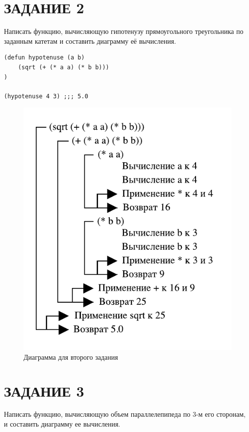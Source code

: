 \section{ЗАДАНИЕ 2}

Написать функцию, вычисляющую гипотенузу прямоугольного
треугольника по заданным катетам и составить диаграмму её вычисления.

\begin{lstlisting}
(defun hypotenuse (a b)
    (sqrt (+ (* a a) (* b b)))
)

(hypotenuse 4 3) ;;; 5.0
\end{lstlisting}

\begin{figure}[H]
    \centering
    \includegraphics{img/02.pdf}
    \caption{Диаграмма для второго задания}
\end{figure}

\section{ЗАДАНИЕ 3}

Написать функцию, вычисляющую объем параллелепипеда
по 3-м его сторонам, и составить диаграмму ее вычисления.

